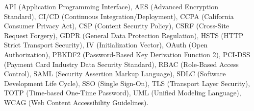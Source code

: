 \documentclass[12pt,a4paper]{article}
\begin{document}
\begin{minipage}{\linewidth}
  \small\raggedright
  API (Application Programming Interface), AES (Advanced Encryption Standard), CI/CD (Continuous Integration/Deployment), CCPA (California Consumer Privacy Act), CSP (Content Security Policy), CSRF (Cross-Site Request Forgery), GDPR (General Data Protection Regulation), HSTS (HTTP Strict Transport Security), IV (Initialization Vector), OAuth (Open Authorization), PBKDF2 (Password-Based Key Derivation Function 2), PCI-DSS (Payment Card Industry Data Security Standard), RBAC (Role-Based Access Control), SAML (Security Assertion Markup Language), SDLC (Software Development Life Cycle), SSO (Single Sign-On), TLS (Transport Layer Security), TOTP (Time-based One-Time Password), UML (Unified Modeling Language), WCAG (Web Content Accessibility Guidelines).
\end{minipage}
\end{document}
